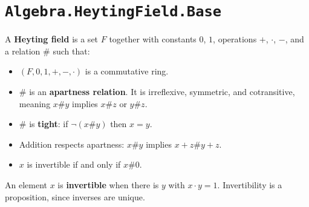 \section{\texttt{Algebra.HeytingField.Base}}

\begin{definition}
  \label{IsHeytingField}
  A \textbf{Heyting field} is a set $F$ together with constants $0$, $1$, operations $+$, $\cdot$, $-$, and a relation $\#$ such that:
  \begin{itemize}
  \item $(F, 0, 1, +, -, \cdot)$ is a commutative ring.
  \item $\#$ is an \textbf{apartness relation}. It is irreflexive, symmetric, and cotransitive, meaning $x \# y$ implies $x \# z$ or $y \# z$.
  \item $\#$ is \textbf{tight}: if $\neg(x \# y)$ then $x = y$.
  \item Addition respects apartness: $x \# y$ implies $x + z \# y + z$.
  \item $x$ is invertible if and only if $x \# 0$.
  \end{itemize}
  An element $x$ is \textbf{invertible} when there is $y$ with $x \cdot y = 1$. Invertibility is a proposition, since inverses are unique.
\end{definition}
